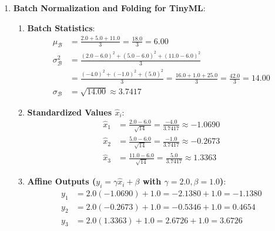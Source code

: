 \begin{enumerate}
\begin{enumerate}[label=(\alph*)]
        \item \textbf{Proof of Expected Value}:
        The mask variable $m_j \in \{0, 1\}$ takes value $1$ with probability $1 - p$ and value $0$ with probability $p$. Taking the expectation:
        \begin{align*}
        \mathbb{E}[\tilde{h}_j] &= \mathbb{E}\left[ \frac{1}{1 - p} h_j m_j \right] = \frac{h_j}{1 - p} \mathbb{E}[m_j] \\
        &= \frac{h_j}{1 - p} \left[ 1 \cdot (1 - p) + 0 \cdot p \right] = \frac{h_j}{1 - p} (1 - p) = \mathbf{h_j}
        \end{align*}
        The expected signal energy during training exactly matches the uncorrupted test-time energy.
    \end{enumerate}

    \item \textbf{Batch Normalization and Folding for TinyML}:
    \begin{enumerate}[label=(\alph*)]
        \item \textbf{Batch Statistics}:
        \begin{align*}
        \mu_{\mathcal{B}} &= \frac{2.0 + 5.0 + 11.0}{3} = \frac{18.0}{3} = \mathbf{6.00} \\
        \sigma_{\mathcal{B}}^2 &= \frac{(2.0 - 6.0)^2 + (5.0 - 6.0)^2 + (11.0 - 6.0)^2}{3} \\
        &= \frac{(-4.0)^2 + (-1.0)^2 + (5.0)^2}{3} = \frac{16.0 + 1.0 + 25.0}{3} = \frac{42.0}{3} = \mathbf{14.00} \\
        \sigma_{\mathcal{B}} &= \sqrt{14.00} \approx \mathbf{3.7417}
        \end{align*}

        \item \textbf{Standardized Values $\hat{x}_i$}:
        \begin{align*}
        \hat{x}_1 &= \frac{2.0 - 6.0}{\sqrt{14}} = \frac{-4.0}{3.7417} \approx \mathbf{-1.0690} \\
        \hat{x}_2 &= \frac{5.0 - 6.0}{\sqrt{14}} = \frac{-1.0}{3.7417} \approx \mathbf{-0.2673} \\
        \hat{x}_3 &= \frac{11.0 - 6.0}{\sqrt{14}} = \frac{5.0}{3.7417} \approx \mathbf{1.3363}
        \end{align*}

        \item \textbf{Affine Outputs ($y_i = \gamma \hat{x}_i + \beta$ with $\gamma = 2.0, \beta = 1.0$)}:
        \begin{align*}
        y_1 &= 2.0(-1.0690) + 1.0 = -2.1380 + 1.0 = \mathbf{-1.1380} \\
        y_2 &= 2.0(-0.2673) + 1.0 = -0.5346 + 1.0 = \mathbf{0.4654} \\
        y_3 &= 2.0(1.3363) + 1.0 = 2.6726 + 1.0 = \mathbf{3.6726}
        \end{align*}


\end{enumerate}
\end{enumerate}
